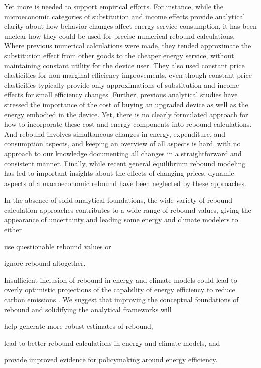 \documentclass[12pt]{article}\usepackage[]{graphicx}\usepackage[]{xcolor}
\begin{document}
Yet more is needed to support empirical efforts.
For instance, while the microeconomic categories of substitution and
income effects provide analytical clarity about how behavior
changes affect energy service consumption,
it has been unclear how they could be used 
for precise numerical rebound calculations. 
Where previous numerical calculations were made, 
they tended approximate the substitution effect
from other goods to the cheaper energy service, 
without maintaining constant utility for the device user.
They also used constant price elasticities
for non-marginal efficiency improvements,
even though constant price elasticities typically
provide only approximations of substitution and
income effects for small efficiency changes.
Further, previous analytical studies have stressed the importance of the
cost of buying an upgraded device as well as the energy embodied in the device.
Yet, there is no clearly formulated approach for how to incorporate these 
cost and energy components into rebound calculations. 
And rebound involves simultaneous changes in energy, expenditure,
and consumption aspects, and keeping an overview of all
aspects is hard, with no approach to our knowledge documenting all 
changes in a straightforward and consistent manner.
Finally, while recent general equilibrium rebound modeling has led to 
important insights about the effects of changing prices,
dynamic aspects of a macroeconomic rebound have
been neglected by these approaches.

In the absence of solid analytical foundations, 
the wide variety of rebound calculation approaches 
contributes to a wide range of rebound values, 
giving the appearance of uncertainty and
leading some energy and climate modelers to either 
%
\begin{enumerate*}[label={(\roman*)}]

  \item use questionable rebound values or 
  
  \item ignore rebound altogether.

\end{enumerate*}
%
Insufficient inclusion of rebound in energy and climate models
could lead to overly optimistic projections
of the capability of energy efficiency 
to reduce carbon emissions \citep{Brockway:2021ww}. 
We suggest that 
improving the conceptual foundations of rebound and
solidifying the analytical frameworks
will
%
\begin{enumerate*}[label={(\roman*)}]

  \item help generate more robust estimates of rebound,
  
  \item lead to better rebound calculations 
        in energy and climate models, and 
  
  \item provide improved evidence 
        for policymaking around energy efficiency. 

\end{enumerate*}
\end{document}
